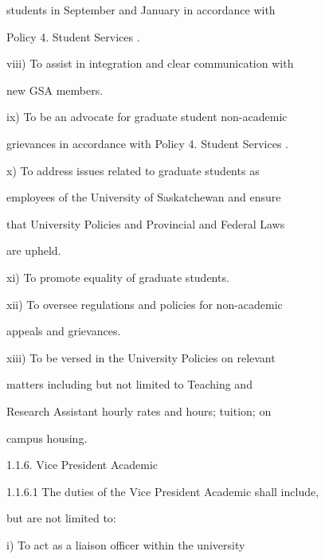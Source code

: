                   students  in  September  and  January  in  accordance  with  



                  Policy 4. Student Services .   

  

         viii)    To  assist  in  integration  and  clear  communication  with  

                  new GSA members.   

  

         ix)      To  be  an  advocate  for  graduate  student  non-academic  

                  grievances in accordance with Policy 4. Student Services .   

  

         x)       To     address      issues     related     to    graduate       students      as  

                  employees of the University of Saskatchewan and ensure  

                  that University Policies and Provincial and Federal Laws  

                  are upheld.   

  

         xi)      To promote equality of graduate students.   

  

         xii)     To  oversee  regulations  and  policies  for  non-academic  

                  appeals and grievances.   

         xiii)    To  be  versed  in  the  University  Policies  on  relevant  

                  matters   including   but   not   limited   to   Teaching   and  

                  Research  Assistant  hourly  rates  and  hours;  tuition;  on  

                  campus housing.  

1.1.6. Vice President Academic  

1.1.6.1           The duties of the Vice President Academic shall include,  

         but are not limited to:   

  

         i)       To     act    as   a    liaison     officer     within      the    university  




